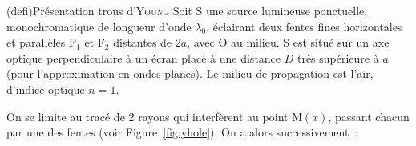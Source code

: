 \documentclass[../../main/main.tex]{subfiles}
\begin{document}
\begin{tcb*}[breakable](defi){Présentation trous d'\textsc{Young}}
	Soit S une source lumineuse ponctuelle, monochromatique de longueur d'onde
	$\lambda_0$, éclairant deux fentes fines horizontales et parallèles F$_1$ et
	F$_2$ distantes de $2a$, avec O au milieu. S est situé sur un axe optique
	perpendiculaire à un écran placé à une distance $D$ très supérieure à $a$
	(pour l'approximation en ondes planes). Le milieu de propagation est l'air,
	d'indice optique $n=1$.
	\begin{center}
		\label{fig:yhole}
	\end{center}
\end{tcb*}
On se limite au tracé de 2 rayons qui interfèrent au point M$(x)$, passant
chacun par une des fentes (voir Figure~\ref{fig:yhole}). On a alors
successivement~:
\end{document}
